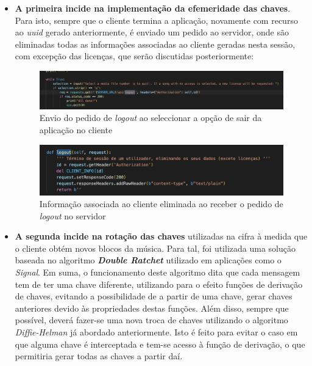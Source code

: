 \documentclass[10pt,english]{article}
\begin{document}
\begin{itemize}
    
\item  \textbf{A primeira incide na implementação da efemeridade das chaves}. Para isto, sempre que o cliente termina a aplicação, novamente com recurso ao \textit{uuid} gerado anteriormente, é enviado um pedido ao servidor, onde são eliminadas todas as informações associadas ao cliente geradas nesta sessão, com excepção das licenças, que serão discutidas posteriormente:

\begin{figure}[!h]
        \centering
        \includegraphics[width=\textwidth]{images/logout_client.png}
        \caption{Envio do pedido de \textit{logout} ao seleccionar a opção de sair da aplicação no cliente}
\end{figure}

\begin{figure}[!h]
        \centering
        \includegraphics[width=\textwidth]{images/logout_server.png}
        \caption{Informação associada ao cliente eliminada ao receber o pedido de \textit{logout} no servidor}
\end{figure}


\item \textbf{A segunda incide na rotação das chaves} utilizadas na cifra à medida que o cliente obtém novos blocos da música. Para tal, foi utilizada uma solução baseada no algoritmo \textbf{\textit{Double Ratchet}} utilizado em aplicações como o \textit{Signal}. Em suma, o funcionamento deste algoritmo dita que cada mensagem tem de ter uma chave diferente, utilizando para o efeito funções de derivação de chaves, evitando a possibilidade de a partir de uma chave, gerar chaves anteriores devido às propriedades destas funções. Além disso, sempre que possível, deverá fazer-se uma nova troca de chaves utilizando o algoritmo \textit{Diffie-Helman} já abordado anteriormente. Isto é feito para evitar o caso em que alguma chave é interceptada e tem-se acesso à função de derivação, o que permitiria gerar todas as chaves a partir daí.


\end{itemize}
\end{document}
